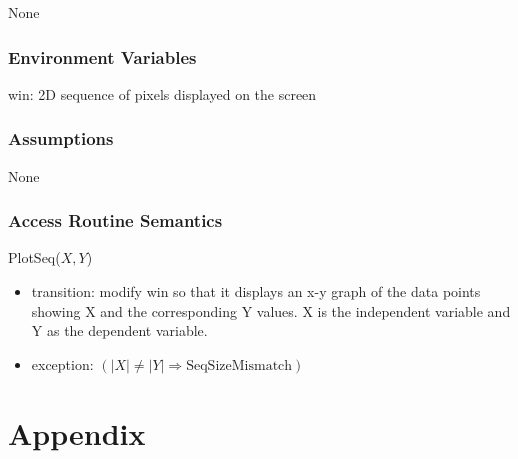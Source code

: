 \documentclass[12pt, titlepage]{article}
\begin{document}
None

\subsubsection{Environment Variables}

win: 2D sequence of pixels displayed on the screen\\

\subsubsection{Assumptions}

None

\subsubsection{Access Routine Semantics}

\noindent PlotSeq($X, Y$)
\begin{itemize}
\item transition: modify win so that it displays an x-y graph of the data points
  showing X and the corresponding Y values.  X is the independent variable
  and Y as the dependent variable.
\item exception: $( |X| \neq |Y| \Rightarrow \mbox{SeqSizeMismatch})$
\end{itemize}

\newpage

\section{Appendix} \label{Appendix}

\renewcommand{\arraystretch}{1.2}
\end{document}
